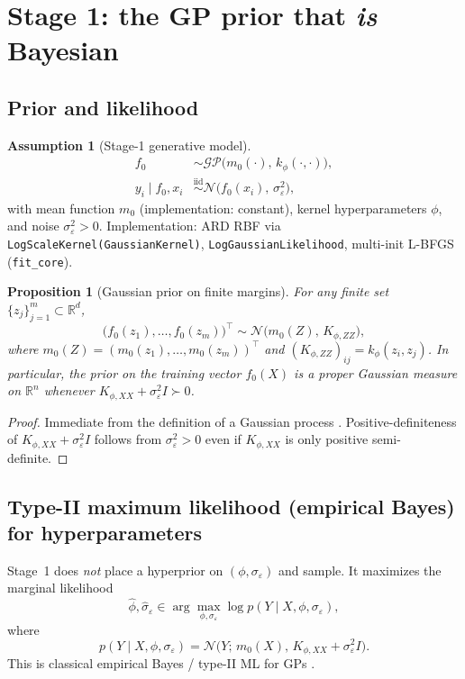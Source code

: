 \documentclass[11pt,a4paper]{article}
\theoremstyle{plain}
\newtheorem{proposition}[theorem]{Proposition}
\theoremstyle{definition}
\newtheorem{assumption}[theorem]{Assumption}
\theoremstyle{remark}
\newcommand{\R}{\mathbb{R}}
\newcommand{\Ncal}{\mathcal{N}}
\newcommand{\GP}{\mathcal{GP}}
\begin{document}
\section{Stage 1: the GP prior that \emph{is} Bayesian}
\label{sec:stage1}

\subsection{Prior and likelihood}
\begin{assumption}[Stage-1 generative model]
\begin{align}
  f_0
  &\sim
  \GP\bigl(m_0(\cdot),\,k_\phi(\cdot,\cdot)\bigr),
  \label{eq:gp-prior}
  \\
  y_i\mid f_0,x_i
  &\stackrel{\mathrm{iid}}{\sim}
  \Ncal\!\bigl(f_0(x_i),\,\sigma_\varepsilon^2\bigr),
  \label{eq:obs}
\end{align}
with mean function \(m_0\) (implementation: constant), kernel hyperparameters \(\phi\),
and noise \(\sigma_\varepsilon^2>0\).
Implementation: ARD RBF via \texttt{LogScaleKernel(GaussianKernel)},
\texttt{LogGaussianLikelihood}, multi-init L-BFGS (\texttt{fit\_core}).
\end{assumption}

\begin{proposition}[Gaussian prior on finite margins]
For any finite set \(\{z_j\}_{j=1}^{m}\subset\R^d\),
\[
  \bigl(f_0(z_1),\ldots,f_0(z_m)\bigr)^\top
  \sim
  \Ncal\bigl(m_0(Z),\,K_{\phi,ZZ}\bigr),
\]
where \(m_0(Z)=(m_0(z_1),\ldots,m_0(z_m))^\top\) and
\((K_{\phi,ZZ})_{ij}=k_\phi(z_i,z_j)\).
In particular, the prior on the training vector \(f_0(X)\) is a proper Gaussian measure
on \(\R^n\) whenever \(K_{\phi,XX}+\sigma_\varepsilon^2 I\succ 0\).
\end{proposition}

\begin{proof}
Immediate from the definition of a Gaussian process
\citep{RasmussenWilliams2006}.
Positive-definiteness of \(K_{\phi,XX}+\sigma_\varepsilon^2 I\) follows from
\(\sigma_\varepsilon^2>0\) even if \(K_{\phi,XX}\) is only positive semi-definite.
\end{proof}

\subsection{Type-II maximum likelihood (empirical Bayes) for hyperparameters}
Stage~1 does \emph{not} place a hyperprior on \((\phi,\sigma_\varepsilon)\) and sample.
It maximizes the marginal likelihood
\begin{equation}
  \hat\phi,\hat\sigma_\varepsilon
  \in
  \arg\max_{\phi,\sigma_\varepsilon}
  \log p(Y\mid X,\phi,\sigma_\varepsilon),
  \label{eq:typeII}
\end{equation}
where
\[
  p(Y\mid X,\phi,\sigma_\varepsilon)
  =
  \Ncal\!\bigl(Y;\,m_0(X),\,K_{\phi,XX}+\sigma_\varepsilon^2 I\bigr).
\]
This is classical empirical Bayes / type-II ML for GPs
\citep{RasmussenWilliams2006}.
\end{document}
